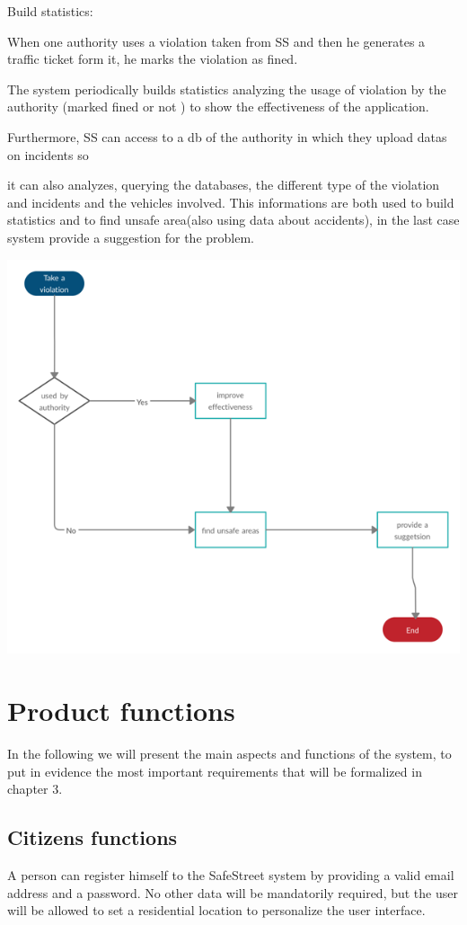 \documentclass[../RASD.tex]{subfiles}
\begin{document}
    Build statistics:

    When one authority uses a violation taken from SS and then he generates a traffic ticket form it, he marks the violation as fined.

    The system periodically builds statistics analyzing the usage of violation by the authority (marked fined or not ) to show the effectiveness of the application.

    Furthermore, SS can access to a db of the authority in which they upload datas on incidents so

    it can also analyzes, querying the databases, the different type of the violation and incidents and the vehicles involved. This informations are both used to build statistics and to find unsafe area(also using data about accidents), in the last case system provide a suggestion for the problem.
    \begin{center}
        \includegraphics[scale = 2.0]{assets/buildStatistics.png}\\
    \end{center}
    \section{Product functions}\label{sec:product-functions}
    In the following we will present the main aspects and functions of the system, to put in evidence the most important requirements that will be formalized in chapter 3.
    \subsection{Citizens functions}\label{subsec:citizen-functions}
    A person can register himself to the SafeStreet system by providing a valid email address and a password. No other data will be mandatorily required, but the user will be allowed to set a residential location to personalize the user interface.
\end{document}
